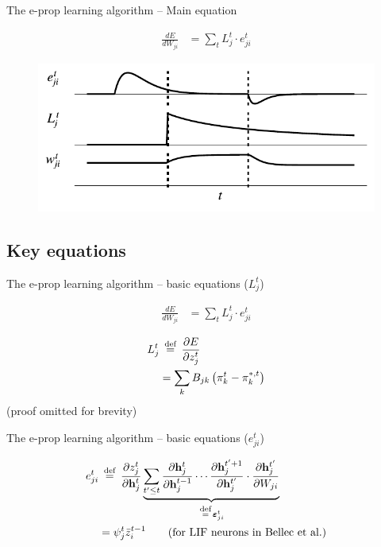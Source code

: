 \documentclass[t]{beamer}
\newcommand\eqdef{\ \mathrel{\overset{\makebox[0pt]{\mbox{\normalfont\scriptsize\rmfamily def}}}{=}}\ }
\begin{document}
\begin{frame}{The e-prop learning algorithm -- Main equation}
	
	\begin{align*}
		\frac{dE}{dW_{ji}} 
		&= \sum_tL_j^t \cdot e_{ji}^t
	\end{align*}
	
	\begin{figure}[!ht]
		\includegraphics[width=0.8\linewidth]{eligibility.pdf}
	\end{figure}
	
\end{frame}

\subsection{Key equations}
\begin{frame}{The e-prop learning algorithm -- basic equations ($L^t_j$)}
	
	\begin{align*}
		\frac{dE}{dW_{ji}} 
		&= \sum_tL_j^t \cdot e_{ji}^t
	\end{align*}
	
	\begin{align*}
L^t_j &\eqdef \frac{\partial E}{\partial z^t_j}\\ &= \sum_kB_{jk}\left(\pi^t_k-\pi_k^{*,t}\right)
\end{align*}
	(proof omitted for brevity)
	
\end{frame}

\begin{frame}{The e-prop learning algorithm -- basic equations ($e^t_{ji}$)}

	\begin{align*}
e^t_{ji} &\eqdef \frac{\partial z_j^t}{\partial\mathbf{h}_j^t}\underbrace{\sum_{t'\leq t}\frac{\partial\mathbf{h}^t_j}{\partial\mathbf{h}_j^{t-1}} \cdots \frac{\partial\mathbf{h}_j^{t'+1}}{\partial\mathbf{h}_j^{t'}}\cdot\frac{\partial\mathbf{h}_j^{t'}}{\partial W_{ji}}}_{\eqdef \bm{\varepsilon}_{ji}^t}\\
&= \psi_j^t\bar{z}^{t-1}_i\qquad\text{(for LIF neurons in Bellec et al.)}
\end{align*}
	
	
\end{frame}
\end{document}

